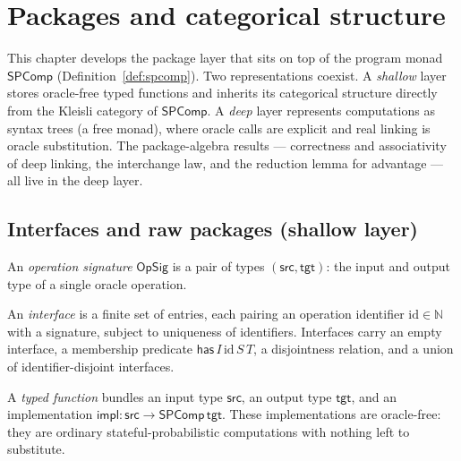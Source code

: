 \chapter{Packages and categorical structure}

This chapter develops the package layer that sits on top of the program monad
$\mathsf{SPComp}$ (Definition~\ref{def:spcomp}). Two representations coexist. A
\emph{shallow} layer stores oracle-free typed functions and inherits its
categorical structure directly from the Kleisli category of $\mathsf{SPComp}$.
A \emph{deep} layer represents computations as syntax trees (a free monad),
where oracle calls are explicit and real linking is oracle substitution. The
package-algebra results — correctness and associativity of deep linking, the
interchange law, and the reduction lemma for advantage — all live in the deep
layer.

\section{Interfaces and raw packages (shallow layer)}

\begin{definition}
  \label{def:opsig}
  \leanok
  An \emph{operation signature} $\mathsf{OpSig}$ is a pair of types
  $(\mathsf{src}, \mathsf{tgt})$: the input and output type of a single oracle
  operation.
\end{definition}

\begin{definition}[Interface]
  \label{def:interface}
  \leanok
  An \emph{interface} is a finite set of entries, each pairing an operation
  identifier $\mathrm{id} \in \mathbb{N}$ with a signature, subject to
  uniqueness of identifiers. Interfaces carry an empty interface, a membership
  predicate $\mathsf{has}\,I\,\mathrm{id}\,S\,T$, a disjointness relation, and a
  union of identifier-disjoint interfaces.
\end{definition}

\begin{definition}
  \label{def:typedfun}
  \leanok
  A \emph{typed function} bundles an input type $\mathsf{src}$, an output type
  $\mathsf{tgt}$, and an implementation $\mathsf{impl} : \mathsf{src} \to
  \mathsf{SPComp}\,\mathsf{tgt}$. These implementations are oracle-free: they
  are ordinary stateful-probabilistic computations with nothing left to
  substitute.
\end{definition}

